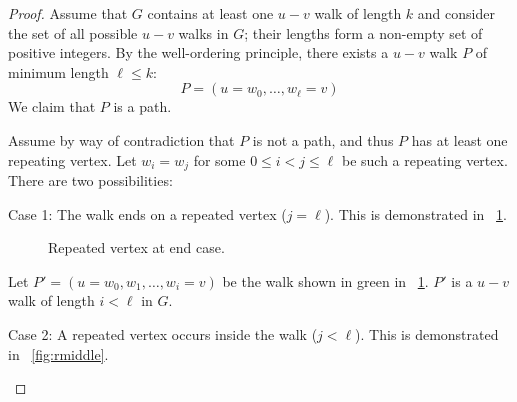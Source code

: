 \begin{proof}
  Assume that \(G\) contains at least one \(u-v\) walk of length \(k\) and consider the set of all possible \(u-v\)
  walks in \(G\); their lengths form a non-empty set of positive integers.  By the well-ordering principle, there
  exists a \(u-v\) walk \(P\) of minimum length \(\ell\le k\):
  \[P=(u=w_0,\ldots,w_{\ell}=v)\]
  We claim that \(P\) is a path.

  Assume by way of contradiction that \(P\) is not a path, and thus \(P\) has at least one repeating vertex.  Let
  \(w_i=w_j\) for some \(0\le i<j\le\ell\) be such a repeating vertex.  There are two possibilities:
  
  \begin{description}
  \item Case 1: The walk ends on a repeated vertex (\(j=\ell\)).  This is demonstrated in
    \figurename~\ref{fig:rend}.

    \begin{figure}[H]
      \centering
      \caption{Repeated vertex at end case.}
      \label{fig:rend}
    \end{figure}

    Let \(P'=(u=w_0,w_1,\ldots,w_i=v)\) be the walk shown in green in \figurename~\ref{fig:rend}.  \(P'\) is a
    \(u-v\) walk of length \(i<\ell\) in \(G\).

  \item Case 2: A repeated vertex occurs inside the walk (\(j<\ell\)).  This is demonstrated in
    \figurename~\ref{fig:rmiddle}.
    

\end{description}
\end{proof}
